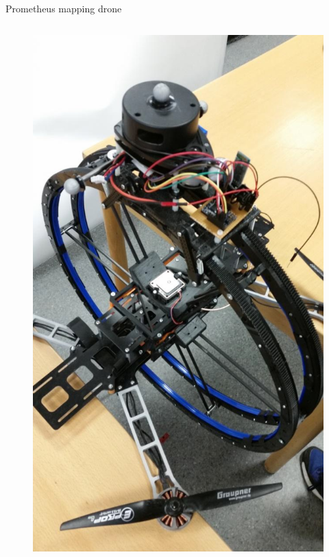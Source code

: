 \documentclass[]{beamer}
\begin{document}
\begin{frame}{Prometheus mapping drone}
\begin{columns}
\begin{column}{.5\textwidth}
\begin{figure}
					\includegraphics[scale=0.2]{images/prometheus3.jpg}
				\end{figure}
			\end{column}
		\end{columns}
	\end{frame}
	
\end{document}
